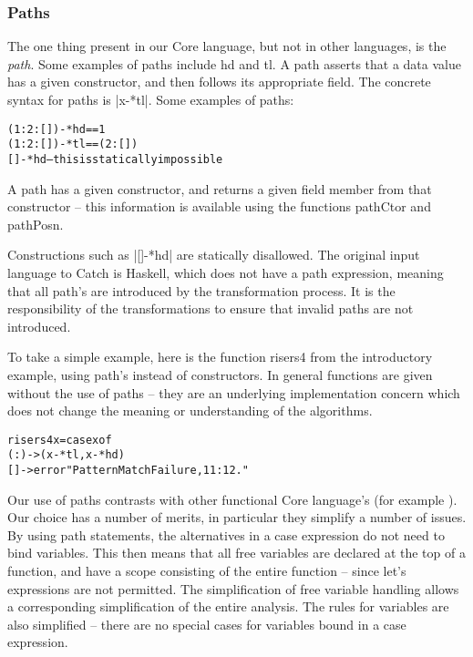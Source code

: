 \documentclass[preprint]{sigplanconf}
\newcommand{\C}[1]{\textsf{#1}}
\newenvironment{code}{\begin{alltt}\small}{\end{alltt}}
\begin{document}
\subsubsection{Paths}

The one thing present in our Core language, but not in other languages, is the \textit{path}. Some examples of paths include \C{hd} and \C{tl}. A path asserts that a data value has a given constructor, and then follows its appropriate field. The concrete syntax for paths is |x-*tl|. Some examples of paths:

\begin{code}
(1:2:[])-*hd == 1
(1:2:[])-*tl == (2:[])
[]-*hd -- this is statically impossible
\end{code}

A path has a given constructor, and returns a given field member from that constructor -- this information is available using the functions \C{pathCtor} and \C{pathPosn}.

Constructions such as |[]-*hd| are statically disallowed. The original input language to Catch is Haskell, which does not have a path expression, meaning that all path's are introduced by the transformation process. It is the responsibility of the transformations to ensure that invalid paths are not introduced.

To take a simple example, here is the function \C{risers4} from the introductory example, using path's instead of constructors. In general functions are given without the use of paths -- they are an underlying implementation concern which does not change the meaning or understanding of the algorithms.

\begin{code}
risers4 x = case x of
    (:) -> (x-*tl, x-*hd)
    [] -> error "Pattern Match Failure, 11:12."
\end{code}

Our use of paths contrasts with other functional Core language's (for example \citet{ghc_core}). Our choice has a number of merits, in particular they simplify a number of issues. By using path statements, the alternatives in a \C{case} expression do not need to bind variables. This then means that all free variables are declared at the top of a function, and have a scope consisting of the entire function -- since let's expressions are not permitted. The simplification of free variable handling allows a corresponding simplification of the entire analysis. The rules for variables are also simplified -- there are no special cases for variables bound in a case expression.
\end{document}
